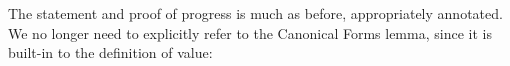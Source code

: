 \begin{fence}
\begin{code}%
\>[0]\AgdaSpace{}%
\AgdaSpace{}%
\AgdaSymbol{\{}\AgdaSymbol{\}}\AgdaSpace{}%
\AgdaSymbol{(}\AgdaSpace{}%
\AgdaSymbol{:}\AgdaSpace{}%
\AgdaSpace{}%
\AgdaSpace{}%
\AgdaSymbol{)}\AgdaSpace{}%
\AgdaSymbol{:}\AgdaSpace{}%
\AgdaSpace{}%
\<%
\\
%
\\[\AgdaEmptyExtraSkip]%
\>[0][@{}l@{\AgdaIndent{0}}]%
\>[2]\AgdaSpace{}%
\AgdaSymbol{:}\AgdaSpace{}%
\AgdaSpace{}%
\AgdaSymbol{\{}\AgdaSpace{}%
\AgdaSymbol{:}\AgdaSpace{}%
\AgdaSpace{}%
\AgdaSpace{}%
\AgdaSymbol{\}}\<%
\\
\>[2][@{}l@{\AgdaIndent{0}}]%
\>[4]%
\>[1926I]\AgdaSpace{}%
\AgdaSpace{}%
\<%
\\
\>[.][@{}l@{}]\<[1926I]%
\>[6]\AgdaComment{----------}\<%
\\
%
\>[4]\AgdaSpace{}%
\AgdaSpace{}%
\<%
\\
%
\\[\AgdaEmptyExtraSkip]%
%
\>[2]\AgdaSpace{}%
\AgdaSymbol{:}\<%
\\
\>[2][@{}l@{\AgdaIndent{0}}]%
\>[6]\AgdaSpace{}%
\<%
\\
%
\>[6]\AgdaComment{----------}\<%
\\
\>[2][@{}l@{\AgdaIndent{0}}]%
\>[4]\AgdaSpace{}%
\AgdaSpace{}%
\<%
\end{code}
\end{fence}

The statement and proof of progress is much as before, appropriately
annotated. We no longer need to explicitly refer to the Canonical Forms
lemma, since it is built-in to the definition of value:

